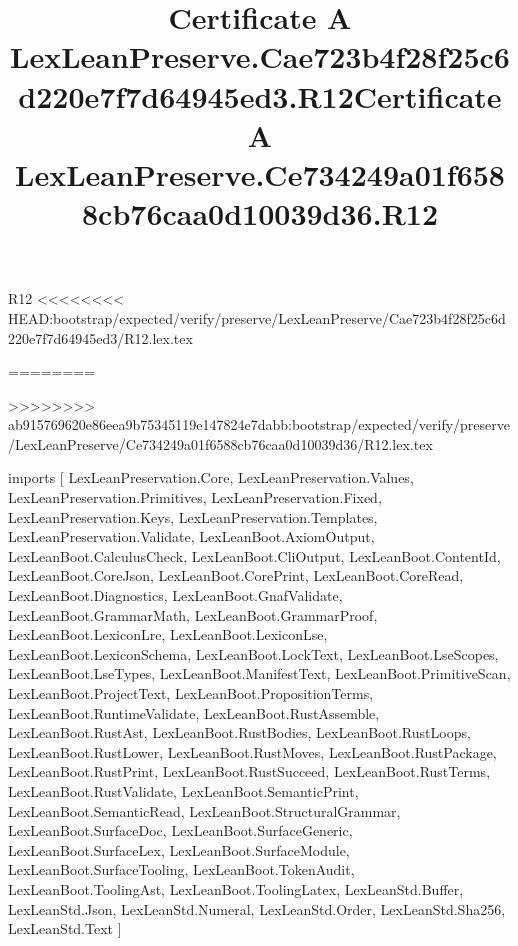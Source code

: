 \begin{lexlean}{R12}
<<<<<<<< HEAD:bootstrap/expected/verify/preserve/LexLeanPreserve/Cae723b4f28f25c6d220e7f7d64945ed3/R12.lex.tex
\title{Certificate A LexLeanPreserve.Cae723b4f28f25c6d220e7f7d64945ed3.R12}
========
\title{Certificate A LexLeanPreserve.Ce734249a01f6588cb76caa0d10039d36.R12}
>>>>>>>> ab915769620e86eea9b75345119e147824e7dabb:bootstrap/expected/verify/preserve/LexLeanPreserve/Ce734249a01f6588cb76caa0d10039d36/R12.lex.tex
\begin{coremodule}
imports [
  LexLeanPreservation.Core,
  LexLeanPreservation.Values,
  LexLeanPreservation.Primitives,
  LexLeanPreservation.Fixed,
  LexLeanPreservation.Keys,
  LexLeanPreservation.Templates,
  LexLeanPreservation.Validate,
  LexLeanBoot.AxiomOutput,
  LexLeanBoot.CalculusCheck,
  LexLeanBoot.CliOutput,
  LexLeanBoot.ContentId,
  LexLeanBoot.CoreJson,
  LexLeanBoot.CorePrint,
  LexLeanBoot.CoreRead,
  LexLeanBoot.Diagnostics,
  LexLeanBoot.GnafValidate,
  LexLeanBoot.GrammarMath,
  LexLeanBoot.GrammarProof,
  LexLeanBoot.LexiconLre,
  LexLeanBoot.LexiconLse,
  LexLeanBoot.LexiconSchema,
  LexLeanBoot.LockText,
  LexLeanBoot.LseScopes,
  LexLeanBoot.LseTypes,
  LexLeanBoot.ManifestText,
  LexLeanBoot.PrimitiveScan,
  LexLeanBoot.ProjectText,
  LexLeanBoot.PropositionTerms,
  LexLeanBoot.RuntimeValidate,
  LexLeanBoot.RustAssemble,
  LexLeanBoot.RustAst,
  LexLeanBoot.RustBodies,
  LexLeanBoot.RustLoops,
  LexLeanBoot.RustLower,
  LexLeanBoot.RustMoves,
  LexLeanBoot.RustPackage,
  LexLeanBoot.RustPrint,
  LexLeanBoot.RustSucceed,
  LexLeanBoot.RustTerms,
  LexLeanBoot.RustValidate,
  LexLeanBoot.SemanticPrint,
  LexLeanBoot.SemanticRead,
  LexLeanBoot.StructuralGrammar,
  LexLeanBoot.SurfaceDoc,
  LexLeanBoot.SurfaceGeneric,
  LexLeanBoot.SurfaceLex,
  LexLeanBoot.SurfaceModule,
  LexLeanBoot.SurfaceTooling,
  LexLeanBoot.TokenAudit,
  LexLeanBoot.ToolingAst,
  LexLeanBoot.ToolingLatex,
  LexLeanStd.Buffer,
  LexLeanStd.Json,
  LexLeanStd.Numeral,
  LexLeanStd.Order,
  LexLeanStd.Sha256,
  LexLeanStd.Text
]


\end{coremodule}
\end{lexlean}
